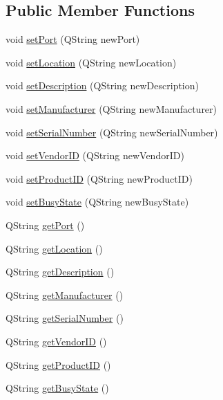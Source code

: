 \subsection*{Public Member Functions}
\begin{DoxyCompactItemize}
\item 
void \mbox{\hyperlink{class_ports_class_a0a7d3dc2ff387559e43d4bbb87aae0f7}{set\+Port}} (Q\+String new\+Port)
\item 
void \mbox{\hyperlink{class_ports_class_a1a5f185d5b9db6407d943187778f3782}{set\+Location}} (Q\+String new\+Location)
\item 
void \mbox{\hyperlink{class_ports_class_a2f06af1956265d0079be56b9b85c3a0f}{set\+Description}} (Q\+String new\+Description)
\item 
void \mbox{\hyperlink{class_ports_class_a0ac6d29d8868c2ebde8811d0249d7e41}{set\+Manufacturer}} (Q\+String new\+Manufacturer)
\item 
void \mbox{\hyperlink{class_ports_class_a42d72f9dd8aff882cb338efe798f1721}{set\+Serial\+Number}} (Q\+String new\+Serial\+Number)
\item 
void \mbox{\hyperlink{class_ports_class_af42f48bd88679919b34f19f0f05673c1}{set\+Vendor\+ID}} (Q\+String new\+Vendor\+ID)
\item 
void \mbox{\hyperlink{class_ports_class_a2bee64115fdaa041202522a909e66e00}{set\+Product\+ID}} (Q\+String new\+Product\+ID)
\item 
void \mbox{\hyperlink{class_ports_class_ad416a34e1604ee80c1aa3f45ac5b1d2c}{set\+Busy\+State}} (Q\+String new\+Busy\+State)
\item 
Q\+String \mbox{\hyperlink{class_ports_class_a0aba12c54c3293a67b28bfc1835b0fd6}{get\+Port}} ()
\item 
Q\+String \mbox{\hyperlink{class_ports_class_a2dea26b21dbd7545b9852d8086ce4657}{get\+Location}} ()
\item 
Q\+String \mbox{\hyperlink{class_ports_class_aabad7eb750a333dc8e8facb741dd62fa}{get\+Description}} ()
\item 
Q\+String \mbox{\hyperlink{class_ports_class_a8a0b3c6b43b97f7a2519942b51cf8db6}{get\+Manufacturer}} ()
\item 
Q\+String \mbox{\hyperlink{class_ports_class_a0fad2da57c4cf364bda2389149844bf7}{get\+Serial\+Number}} ()
\item 
Q\+String \mbox{\hyperlink{class_ports_class_ab855ef36f83175d9178d6c8fde0129cb}{get\+Vendor\+ID}} ()
\item 
Q\+String \mbox{\hyperlink{class_ports_class_a3f8207b8a5519b494aa8ae602019aa32}{get\+Product\+ID}} ()
\item 
Q\+String \mbox{\hyperlink{class_ports_class_a2cfe00d894c50c8b175571455e293497}{get\+Busy\+State}} ()
\end{DoxyCompactItemize}
